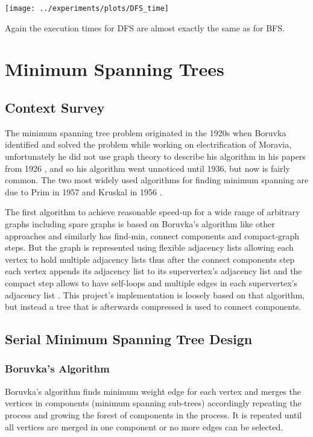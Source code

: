 \documentclass{report}
\theoremstyle{plain}
\theoremstyle{definition}
\theoremstyle{remark}
\begin{document}
\texttt{[image: ../experiments/plots/DFS\_time]}

Again the execution times for DFS are almost exactly the same as for BFS.

\chapter{Minimum Spanning Trees}

\section{Context Survey}

The minimum spanning tree problem originated in the 1920s when Boruvka identified and solved the problem while working on electrification of Moravia, unfortunately he did not use graph theory to describe his algorithm in his papers from 1926 \cite{nevsetvril2001otakar}, and so his algorithm went unnoticed until 1936, but now is fairly common. The two most widely used algorithms for finding minimum spanning are due to Prim in 1957 \cite{Prim1957shortest} and Kruskal in 1956 \cite{kruskal1956shortest}.

The first algorithm to achieve reasonable speed-up for a wide range of arbitrary graphs including spare graphs is based on Boruvka's algorithm like other approaches and similarly has find-min, connect components and compact-graph steps. But the graph is represented using flexible adjacency lists allowing each vertex to hold multiple adjacency lists thus after the connect components step each vertex appends its adjacency list to its supervertex's adjacency list and the compact step allows to have self-loops and multiple edges in each supervertex's adjacency list \cite{Bader20061366}. This project's implementation is loosely based on that algorithm, but instead a tree that is afterwards compressed is used to connect components.

\section{Serial Minimum Spanning Tree Design}

\subsection*{Boruvka's Algorithm}

Boruvka's algorithm finds minimum weight edge for each vertex and merges the vertices in components (minimum spanning sub-trees) accordingly repeating the process and growing the forest of components in the process. It is repeated until all vertices are merged in one component or no more edges can be selected.
\end{document}
